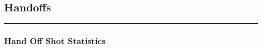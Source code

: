 \documentclass[a4paper,12pt]{article}
\begin{document}
\clearpage


\subsection{Handoffs}

\vspace{1em} %
\hrule height 1pt width 1\textwidth %
\vspace{0em} %

\subsubsection{Hand Off Shot Statistics}
\end{document}
